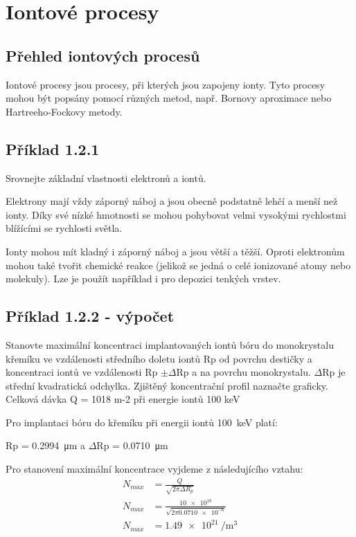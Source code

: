 \section{Iontové procesy}

\subsection{Přehled iontových procesů}

Iontové procesy jsou procesy, při kterých jsou zapojeny ionty. Tyto procesy mohou být popsány pomocí různých metod, např. Bornovy aproximace nebo Hartreeho-Fockovy metody.

\subsection{Příklad 1.2.1}
\begin{zadani}
    Srovnejte základní vlastnosti elektronů a iontů.
\end{zadani}

Elektrony mají vždy záporný náboj a jsou obecně podstatně lehčí a menší než ionty. Díky své nízké hmotnosti se mohou pohybovat velmi vysokými rychlostmi blížícími se rychlosti světla. 

Ionty mohou mít kladný i záporný náboj a jsou větší a těžší. Oproti elektronům mohou také tvořit chemické reakce (jelikož se jedná o celé ionizované atomy nebo molekuly). Lze je použít například i pro depozici tenkých vrstev.


\subsection{Příklad 1.2.2 - výpočet}
\begin{zadani}
    Stanovte maximální koncentraci implantovaných iontů bóru do 
    monokrystalu křemíku ve vzdálenosti středního doletu iontů  Rp od 
    povrchu destičky a koncentraci iontů ve vzdálenosti  Rp \(\pm \Delta\)Rp a na 
    povrchu monokrystalu.  \(\Delta\)Rp  je střední kvadratická odchylka. Zjištěný  
    koncentrační profil naznačte graficky. Celková dávka  Q = 1018 m-2 při  
    energie iontů  100 keV
\end{zadani}


Pro implantaci bóru do křemíku při energii iontů \qty{100}{keV} platí:

Rp = \qty{0,2994}{\micro\meter} a \(\Delta\)Rp = \qty{0,0710}{\micro\meter}

Pro stanovení maximální koncentrace vyjdeme z následujícího vztahu:
\begin{align*}
  N_{max} &= \frac{Q}{\sqrt{2\pi \Delta R_{p} } } \\
  N_{max} &= \frac{\num{10e18}}{\sqrt{2\pi \num{0,0710e-6} } } \\
  N_{max} &= \qty{1,49e21}{\per\meter\cubed}
\end{align*}
